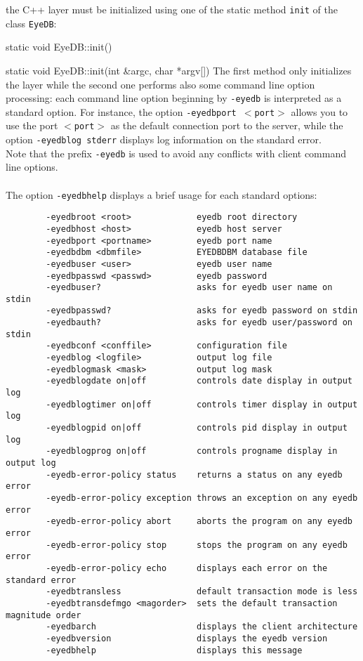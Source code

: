 \item the \eyedb C++ layer must be initialized using one of the static method
\texttt{init} of the class \texttt{EyeDB}:
\be
\item static void EyeDB::init()
\item static void EyeDB::init(int \&argc, char *argv[])
\ee
The first method only initializes the \eyedb layer while the second
one performs also some command line option processing: each command line option
beginning by \texttt{-eyedb} is interpreted as a standard \eyedb option.
For instance, the option \texttt{-eyedbport $<$port$>$} allows you to use
the port \texttt{$<$port$>$} as the default connection port to the \eyedb
server, while the option \texttt{-eyedblog stderr} displays log information
on the standard error.
\\
Note that the prefix \texttt{-eyedb} is used to avoid any conflicts
with client command line options.
\\
\\
The option \texttt{-eyedbhelp} displays a brief usage for each standard options:
\verbsize
\begin{verbatim}
        -eyedbroot <root>             eyedb root directory
        -eyedbhost <host>             eyedb host server
        -eyedbport <portname>         eyedb port name
        -eyedbdbm <dbmfile>           EYEDBDBM database file
        -eyedbuser <user>             eyedb user name
        -eyedbpasswd <passwd>         eyedb password
        -eyedbuser?                   asks for eyedb user name on stdin
        -eyedbpasswd?                 asks for eyedb password on stdin
        -eyedbauth?                   asks for eyedb user/password on stdin
        -eyedbconf <conffile>         configuration file
        -eyedblog <logfile>           output log file
        -eyedblogmask <mask>          output log mask
        -eyedblogdate on|off          controls date display in output log
        -eyedblogtimer on|off         controls timer display in output log
        -eyedblogpid on|off           controls pid display in output log
        -eyedblogprog on|off          controls progname display in output log
        -eyedb-error-policy status    returns a status on any eyedb error
        -eyedb-error-policy exception throws an exception on any eyedb error
        -eyedb-error-policy abort     aborts the program on any eyedb error
        -eyedb-error-policy stop      stops the program on any eyedb error
        -eyedb-error-policy echo      displays each error on the standard error
        -eyedbtransless               default transaction mode is less
        -eyedbtransdefmgo <magorder>  sets the default transaction magnitude order
        -eyedbarch                    displays the client architecture
        -eyedbversion                 displays the eyedb version
        -eyedbhelp                    displays this message
\end{verbatim}
